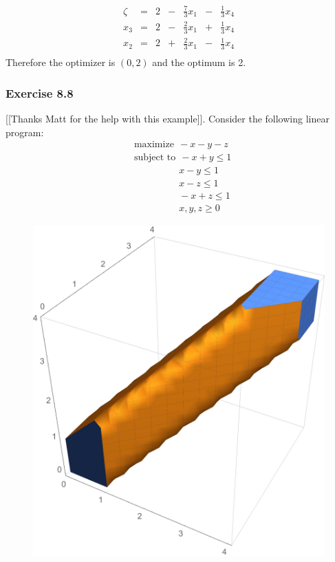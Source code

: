 \documentclass[letterpaper,12pt]{article}
\theoremstyle{definition}
\begin{document}
\begin{equation}
\begin{matrix}
    \zeta & = & 2 & - & \tfrac{7}{3}x_1 & - & \tfrac{1}{3}x_4 \\
    \hline
    x_3 & = & 2 & - & \tfrac{2}{3}x_1 & + & \tfrac{1}{3}x_4 \\
    x_2 & = & 2 & + & \tfrac{2}{3}x_1 & - &
    \tfrac{1}{3}x_4 \\
\end{matrix}
\end{equation}
Therefore the optimizer is $(0,2)$ and the optimum is 2.

\subsubsection*{Exercise 8.8} [[Thanks Matt for the help with this example]].
Consider the following linear program:
\begin{align*}
  &\text{maximize} \ \ -x - y - z \\
  &\text{subject to} \ \ -x + y \leq 1 \\
  &\qquad \qquad \ \ \ x - y \leq 1 \\
  &\qquad \qquad \ \ \ x - z \leq 1 \\
  &\qquad \qquad \ \ \ -x + z \leq 1 \\
  &\qquad \qquad \ \ \ x , y, z \geq 0
\end{align*}
\begin{figure}[H]
  \centering
	\begin{center}
		\includegraphics[scale=.6]{exercise8.jpg}
	\end{center}
\end{figure}
\end{document}
